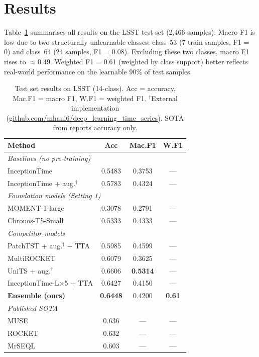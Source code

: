 \documentclass{article}
\begin{document}
\section{Results}

Table~\ref{tab:results} summarises all results on the LSST test set (2,466
samples). Macro F1 is low due to two structurally unlearnable classes:
class~53 (7 train samples, F1 = 0) and class~64 (24 samples, F1 = 0.08).
Excluding these two classes, macro F1 rises to $\approx$0.49.
Weighted F1 = 0.61 (weighted by class support) better reflects real-world
performance on the learnable 90\% of test samples.

\begin{table}[t]
\caption{Test set results on LSST (14-class). Acc = accuracy, Mac.F1 = macro
  F1, W.F1 = weighted F1. $^\dagger$External implementation
  (\url{github.com/mhani6/deep\_learning\_time\_series}).
  SOTA from \citet{bakeoff} reports accuracy only.}
\label{tab:results}
\vskip 0.1in
\begin{center}
\begin{small}
\begin{tabular}{lccc}
\toprule
\textbf{Method} & \textbf{Acc} & \textbf{Mac.F1} & \textbf{W.F1} \\
\midrule
\multicolumn{4}{l}{\textit{Baselines (no pre-training)}} \\
InceptionTime                      & 0.5483 & 0.3753 & — \\
InceptionTime + aug.$^\dagger$     & 0.5783 & 0.4324 & — \\
\midrule
\multicolumn{4}{l}{\textit{Foundation models (Setting 1)}} \\
MOMENT-1-large                     & 0.3078 & 0.2791 & — \\
Chronos-T5-Small                   & 0.5333 & 0.4333 & — \\
\midrule
\multicolumn{4}{l}{\textit{Competitor models}} \\
PatchTST + aug.$^\dagger$ + TTA    & 0.5985 & 0.4599 & — \\
MultiROCKET                        & 0.6079 & 0.3625 & — \\
UniTS + aug.$^\dagger$             & 0.6606 & \textbf{0.5314} & — \\
InceptionTime-L$\times$5 + TTA    & 0.6427 & 0.4150 & — \\
\midrule
\textbf{Ensemble (ours)}           & \textbf{0.6448} & 0.4200 & \textbf{0.61} \\
\midrule
\multicolumn{4}{l}{\textit{Published SOTA \citep{bakeoff}}} \\
MUSE                               & 0.636  & —      & — \\
ROCKET                             & 0.632  & —      & — \\
MrSEQL                             & 0.603  & —      & — \\
\bottomrule
\end{tabular}
\end{small}
\end{center}
\vskip -0.1in
\end{table}
\end{document}

